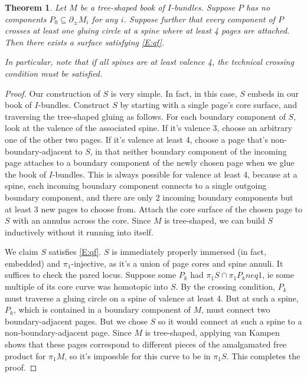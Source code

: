 \documentclass[12pt]{amsart}
\newtheorem{thm}[theorem]{Theorem}
\theoremstyle{definition}
\theoremstyle{remark}
\newcommand{\bd}{\partial}
\newcommand{\cin}{\subseteq}
\begin{document}
{\begin{thm}

Let $M$ be a tree-shaped book of $I$-bundles. Suppose $P$ has no components
$P_0 \cin \bd_\pm M_i$ for any $i$. Suppose further that every
component of $P$ crosses at least one gluing circle at a spine where at least
4 pages are attached. Then there exists a surface satisfying \eqref{E:qf}.

In particular, note that if all spines are at least valence 4, the technical
crossing condition must be satisfied.

\end{thm}
\begin{proof}

Our construction of $S$ is very simple. In fact, in this case, $S$ embeds in
our book of $I$-bundles. Construct $S$ by starting with a single page's core
surface, and traversing the tree-shaped gluing as follows. For each boundary
component of $S$, look at the valence of the associated spine. If it's valence
3, choose an arbitrary one of the other two pages. If it's valence at least 4,
choose a page that's non-boundary-adjacent to $S$, in that neither boundary
component of the incoming page attaches to a boundary component of the newly
chosen page when we glue the book of $I$-bundles. This is always possible for
valence at least 4, because at a spine, each incoming boundary component
connects to a single outgoing boundary component, and there are only 2 incoming
boundary components but at least 3 new pages to choose from. Attach the core
surface of the chosen page to $S$ with an annulus across the core. Since $M$ is
tree-shaped, we can build $S$ inductively without it running into itself.

We claim $S$ satisfies \eqref{E:qf}. $S$ is immediately properly immersed (in
fact, embedded) and $\pi_1$-injective, as it's a union of page cores and spine
annuli. It suffices to check the pared locus. Suppose some $P_k$ had $\pi_1S
\cap \pi_1P_k neq 1$, ie some multiple of its core curve was homotopic into
$S$. By the crossing condition, $P_k$ must traverse a gluing circle on a spine
of valence at least 4.  But at such a spine, $P_k$, which is contained in
a boundary component of $M$, must connect two boundary-adjacent pages. But we
chose $S$ so it would connect at such a spine to a non-boundary-adjacent page.
Since $M$ is tree-shaped, applying van Kampen shows that these pages correspond
to different pieces of the amalgamated free product for $\pi_1M$, so it's
impossble for this curve to be in $\pi_1S$. This completes the proof.


\end{proof}}
\end{document}
